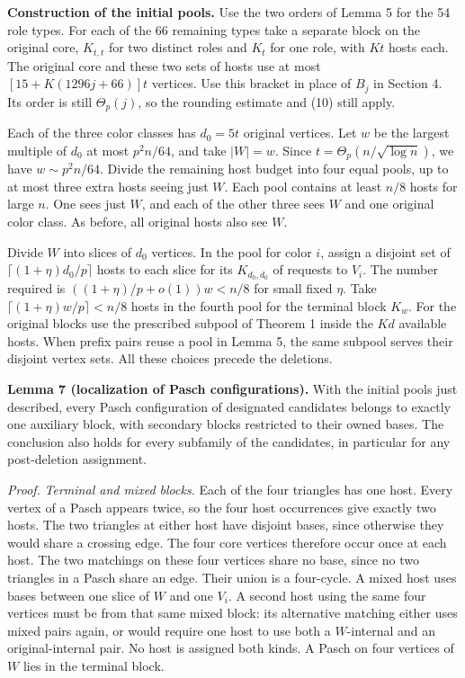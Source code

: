\documentclass[english,11pt,a4paper]{article}
\begin{document}
\textbf{Construction of the initial pools.} Use the two orders of Lemma 5 for the 54 role types. For each of the 66 remaining types take a separate block on the original core, \(K_{t,t}\) for two distinct roles and \(K_t\) for one role, with \(Kt\) hosts each. The original core and these two sets of hosts use at most \([15+K(1296j+66)]t\) vertices. Use this bracket in place of \(B_j\) in Section 4. Its order is still \(\Theta_p(j)\), so the rounding estimate and (10) still apply.

Each of the three color classes has \(d_0=5t\) original vertices. Let \(w\) be the largest multiple of \(d_0\) at most \(p^2 n/64\), and take \(|W|=w\). Since \(t=\Theta_p(n/\sqrt{\log n})\), we have \(w\sim p^2 n/64\). Divide the remaining host budget into four equal pools, up to at most three extra hosts seeing just \(W\). Each pool contains at least \(n/8\) hosts for large \(n\). One sees just \(W\), and each of the other three sees \(W\) and one original color class. As before, all original hosts also see \(W\).

Divide \(W\) into slices of \(d_0\) vertices. In the pool for color \(i\), assign a disjoint set of \(\lceil(1+\eta)d_0/p\rceil\) hosts to each slice for its \(K_{d_0,d_0}\) of requests to \(V_i\). The number required is \(((1+\eta)/p+o(1))w<n/8\) for small fixed \(\eta\). Take \(\lceil(1+\eta)w/p\rceil<n/8\) hosts in the fourth pool for the terminal block \(K_w\). For the original blocks use the prescribed subpool of Theorem 1 inside the \(Kd\) available hosts. When prefix pairs reuse a pool in Lemma 5, the same subpool serves their disjoint vertex sets. All these choices precede the deletions.

\textbf{Lemma 7 (localization of Pasch configurations).} With the initial pools just described, every Pasch configuration of designated candidates belongs to exactly one auxiliary block, with secondary blocks restricted to their owned bases. The conclusion also holds for every subfamily of the candidates, in particular for any post-deletion assignment.

\emph{Proof.} \emph{Terminal and mixed blocks.} Each of the four triangles has one host. Every vertex of a Pasch appears twice, so the four host occurrences give exactly two hosts. The two triangles at either host have disjoint bases, since otherwise they would share a crossing edge. The four core vertices therefore occur once at each host. The two matchings on these four vertices share no base, since no two triangles in a Pasch share an edge. Their union is a four-cycle. A mixed host uses bases between one slice of \(W\) and one \(V_i\). A second host using the same four vertices must be from that same mixed block: its alternative matching either uses mixed pairs again, or would require one host to use both a \(W\)-internal and an original-internal pair. No host is assigned both kinds. A Pasch on four vertices of \(W\) lies in the terminal block.
\end{document}
